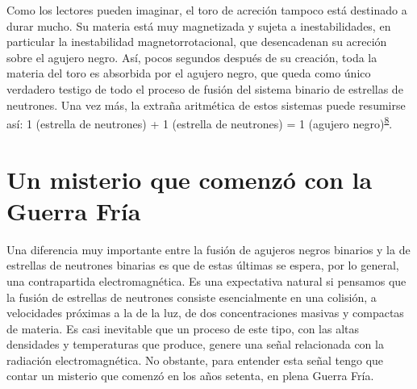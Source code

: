 Como los lectores pueden imaginar, el toro de acreción tampoco está destinado a durar mucho. Su materia está muy magnetizada y sujeta a inestabilidades, en particular la inestabilidad magnetorrotacional, que desencadenan su acreción sobre el agujero negro. Así, pocos segundos después de su creación, toda la materia del toro es absorbida por el agujero negro, que queda como único verdadero testigo de todo el proceso de fusión del sistema binario de estrellas de neutrones. Una vez más, la extraña aritmética de estos sistemas puede resumirse así: 1 (estrella de neutrones) + 1 (estrella de neutrones) = 1 (agujero negro)\textsuperscript{\hyperlink{note:08-08}{8}}.

\section{Un misterio que comenzó con la Guerra Fría}\label{sec:08-gamma}

Una diferencia muy importante entre la fusión de agujeros negros binarios y la de estrellas de neutrones binarias es que de estas últimas se espera, por lo general, una contrapartida electromagnética. Es una expectativa natural si pensamos que la fusión de estrellas de neutrones consiste esencialmente en una colisión, a velocidades próximas a la de la luz, de dos concentraciones masivas y compactas de materia. Es casi inevitable que un proceso de este tipo, con las altas densidades y temperaturas que produce, genere una señal relacionada con la radiación electromagnética. No obstante, para entender esta señal tengo que contar un misterio que comenzó en los años setenta, en plena Guerra Fría.

